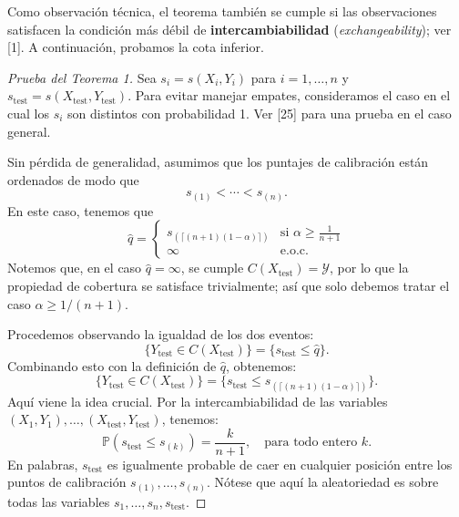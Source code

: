 \documentclass[12pt]{report}
\numberwithin{equation}{section}
\numberwithin{figure}{section}
\numberwithin{table}{section}
\theoremstyle{definition}
\begin{document}
\begin{flushleft}
Como observación técnica, el teorema también se cumple si las observaciones satisfacen la condición más débil de \textbf{intercambiabilidad} (\textit{exchangeability}); ver [1]. A continuación, probamos la cota inferior.

\vspace{0.3cm}
\begin{proof}[Prueba del Teorema 1]
Sea $s_i = s(X_i, Y_i)$ para $i=1,\dots,n$ y $s_\text{test} = s(X_\text{test}, Y_\text{test})$. Para evitar manejar empates, consideramos el caso en el cual los $s_i$ son distintos con probabilidad 1. Ver [25] para una prueba en el caso general.

Sin pérdida de generalidad, asumimos que los puntajes de calibración están ordenados de modo que
\begin{equation*}
s_{(1)} < \cdots < s_{(n)}.
\end{equation*}
En este caso, tenemos que
\begin{equation*}
\hat{q} =
\begin{cases}
    s_{(\lceil (n+1)(1-\alpha)\rceil)} & \text{si } \alpha \ge \frac{1}{n+1}\\
    \infty & \text{e.o.c.}
\end{cases}
\end{equation*}
Notemos que, en el caso $\hat{q} = \infty$, se cumple $C(X_\text{test}) = \mathcal{Y}$, por lo que la propiedad de cobertura se satisface trivialmente; así que solo debemos tratar el caso $\alpha \ge 1/(n+1)$.

Procedemos observando la igualdad de los dos eventos:
\begin{equation*}
\{Y_\text{test} \in C(X_\text{test})\} = \{s_\text{test} \leq \hat{q}\}.
\end{equation*}
Combinando esto con la definición de $\hat{q}$, obtenemos:
\begin{equation*}
\{Y_\text{test} \in C(X_\text{test})\} = \{s_\text{test} \leq s_{(\lceil (n+1)(1-\alpha)\rceil)}\}.
\end{equation*}
Aquí viene la idea crucial. Por la intercambiabilidad de las variables $(X_1,Y_1), \dots, (X_\text{test},Y_\text{test})$, tenemos:
\begin{equation*}
\mathbb{P}(s_\text{test} \leq s_{(k)}) = \frac{k}{n+1}, \quad \text{para todo entero } k.
\end{equation*}
En palabras, $s_\text{test}$ es igualmente probable de caer en cualquier posición entre los puntos de calibración $s_{(1)},\dots,s_{(n)}$. Nótese que aquí la aleatoriedad es sobre todas las variables $s_1,\dots,s_n,s_\text{test}$.


\end{proof}
\end{flushleft}
\end{document}

